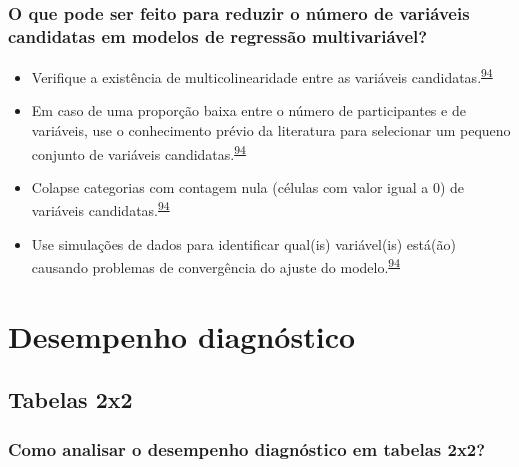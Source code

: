\documentclass[
]{book}
\begin{document}
\hypertarget{o-que-pode-ser-feito-para-reduzir-o-nuxfamero-de-variuxe1veis-candidatas-em-modelos-de-regressuxe3o-multivariuxe1vel}{%
\subsection{O que pode ser feito para reduzir o número de variáveis candidatas em modelos de regressão multivariável?}\label{o-que-pode-ser-feito-para-reduzir-o-nuxfamero-de-variuxe1veis-candidatas-em-modelos-de-regressuxe3o-multivariuxe1vel}}

\begin{itemize}
\item
  Verifique a existência de multicolinearidade entre as variáveis candidatas.\textsuperscript{\protect\hyperlink{ref-Sun1996}{94}}
\item
  Em caso de uma proporção baixa entre o número de participantes e de variáveis, use o conhecimento prévio da literatura para selecionar um pequeno conjunto de variáveis candidatas.\textsuperscript{\protect\hyperlink{ref-Sun1996}{94}}
\item
  Colapse categorias com contagem nula (células com valor igual a 0) de variáveis candidatas.\textsuperscript{\protect\hyperlink{ref-Sun1996}{94}}
\item
  Use simulações de dados para identificar qual(is) variável(is) está(ão) causando problemas de convergência do ajuste do modelo.\textsuperscript{\protect\hyperlink{ref-Sun1996}{94}}
\end{itemize}

\hypertarget{analise-desempenho-diagnostico}{%
\chapter{\texorpdfstring{\textbf{Desempenho diagnóstico}}{Desempenho diagnóstico}}\label{analise-desempenho-diagnostico}}

\hypertarget{tabelas-2x2}{%
\section{Tabelas 2x2}\label{tabelas-2x2}}

\hypertarget{como-analisar-o-desempenho-diagnuxf3stico-em-tabelas-2x2}{%
\subsection{Como analisar o desempenho diagnóstico em tabelas 2x2?}\label{como-analisar-o-desempenho-diagnuxf3stico-em-tabelas-2x2}}
\end{document}
